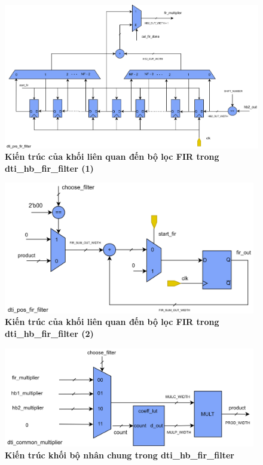 \begin{figure}[H]
    \centering
    \includegraphics[width=15cm]{Images/Chuong4/hb_fir/pre_fir.png}
    \caption[Kiến trúc của khối liên quan đến bộ lọc FIR trong dti\_hb\_fir\_filter (1)]{\bfseries \fontsize{12pt}{0pt}\selectfont Kiến trúc của khối liên quan đến bộ lọc FIR trong dti\_hb\_fir\_filter (1)}
    \label{pre}
\end{figure}
\begin{figure}[H]
    \centering
    \includegraphics[width=11cm]{Images/Chuong4/hb_fir/pos_fir.png}
    \caption[Kiến trúc của khối liên quan đến bộ lọc FIR trong dti\_hb\_fir\_filter (2)]{\bfseries \fontsize{12pt}{0pt}\selectfont Kiến trúc của khối liên quan đến bộ lọc FIR trong dti\_hb\_fir\_filter (2)}
    \label{pos}
\end{figure}

\begin{figure}[H]
    \centering
    \includegraphics[width=11cm]{Images/Chuong4/hb_fir/mul.png}
    \caption[Kiến trúc khối bộ nhân chung trong dti\_hb\_fir\_filter]{\bfseries \fontsize{12pt}{0pt}\selectfont Kiến trúc khối bộ nhân chung trong dti\_hb\_fir\_filter}
    \label{c_mul}
\end{figure}

